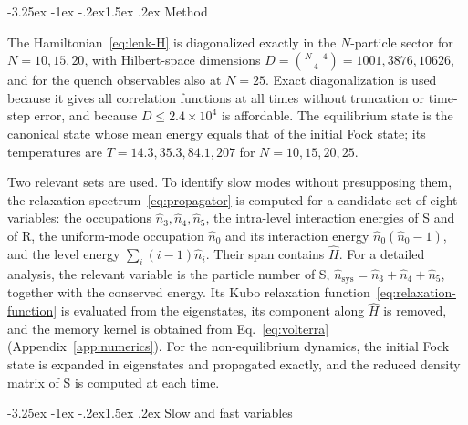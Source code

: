 \documentclass[10pt,a4paper]{article}
\makeatletter
\renewcommand{\subsection}{\@startsection{subsection}{2}{\z@}%
  {-3.25ex \@plus -1ex \@minus -.2ex}{1.5ex \@plus .2ex}%
  {\normalfont\fontsize{15.5pt}{19pt}\selectfont\bfseries}}
\makeatother
\begin{document}
\subsection{Method}
\label{sec:lenk-method}

The Hamiltonian~\eqref{eq:lenk-H} is diagonalized exactly in the $ N $-particle sector for $ N = 10, 15, 20 $, with Hilbert-space dimensions $ D = \binom{N+4}{4} = 1001, 3876, 10626 $, and for the quench observables also at $ N = 25 $.
Exact diagonalization is used because it gives all correlation functions at all times without truncation or time-step error, and because $ D \le 2.4 \times 10^4 $ is affordable.
The equilibrium state is the canonical state whose mean energy equals that of the initial Fock state; its temperatures are $ T = 14.3, 35.3, 84.1, 207 $ for $ N = 10, 15, 20, 25 $.

Two relevant sets are used.
To identify slow modes without presupposing them, the relaxation spectrum~\eqref{eq:propagator} is computed for a candidate set of eight variables: the occupations $ \hat n_3, \hat n_4, \hat n_5 $, the intra-level interaction energies of S and of R, the uniform-mode occupation $ \hat n_0 $ and its interaction energy $ \hat n_0(\hat n_0 - 1) $, and the level energy $ \sum_i (i-1)\hat n_i $. Their span contains $ \hat H $.
For a detailed analysis, the relevant variable is the particle number of S, $ \hat n_{\mathrm{sys}} = \hat n_3 + \hat n_4 + \hat n_5 $, together with the conserved energy.
Its Kubo relaxation function~\eqref{eq:relaxation-function} is evaluated from the eigenstates, its component along $ \hat H $ is removed, and the memory kernel is obtained from Eq.~\eqref{eq:volterra} (Appendix~\ref{app:numerics}).
For the non-equilibrium dynamics, the initial Fock state is expanded in eigenstates and propagated exactly, and the reduced density matrix of S is computed at each time.

\subsection{Slow and fast variables}
\label{sec:lenk-mz}
\end{document}
